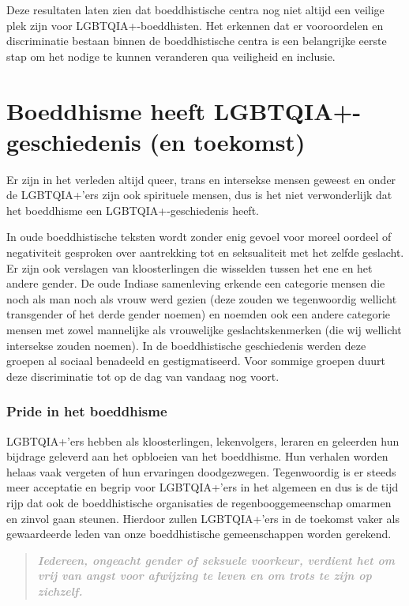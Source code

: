 \documentclass[12pt,openany]{book}
\begin{document}
Deze resultaten laten zien dat boeddhistische centra nog niet altijd een veilige plek zijn voor LGBTQIA+-boeddhisten. Het erkennen dat er vooroordelen en discriminatie bestaan binnen de boeddhistische centra is een belangrijke eerste stap om het nodige te kunnen veranderen qua veiligheid en inclusie.

\section*{Boeddhisme heeft LGBTQIA+-geschiedenis (en toekomst)}

Er zijn in het verleden altijd queer, trans en intersekse mensen geweest en onder de LGBTQIA+'ers zijn ook spirituele mensen, dus is het niet verwonderlijk dat het boeddhisme een LGBTQIA+-geschiedenis heeft.

In oude boeddhistische teksten wordt zonder enig gevoel voor moreel oordeel of negativiteit gesproken over aantrekking tot en seksualiteit met het zelfde geslacht. Er zijn ook verslagen van kloosterlingen die wisselden tussen het ene en het andere gender. De oude Indiase samenleving erkende een categorie mensen die noch als man noch als vrouw werd gezien (deze zouden we tegenwoordig wellicht transgender of het derde gender noemen) en noemden ook een andere categorie mensen met zowel mannelijke als vrouwelijke geslachtskenmerken (die wij wellicht intersekse zouden noemen). In de boeddhistische geschiedenis werden deze groepen al sociaal benadeeld en gestigmatiseerd. Voor sommige groepen duurt deze discriminatie tot op de dag van vandaag nog voort.

\subsubsection*{Pride in het boeddhisme}

LGBTQIA+'ers hebben als kloosterlingen, lekenvolgers, leraren en geleerden hun bijdrage geleverd aan het opbloeien van het boeddhisme. Hun verhalen worden helaas vaak vergeten of hun ervaringen doodgezwegen. Tegenwoordig is er steeds meer acceptatie en begrip voor LGBTQIA+'ers in het algemeen en dus is de tijd rijp dat ook de boeddhistische organisaties de regenbooggemeenschap omarmen en zinvol gaan steunen. Hierdoor zullen LGBTQIA+'ers in de toekomst vaker als gewaardeerde leden van onze boeddhistische gemeenschappen worden gerekend.

\begin{quote}
\textit{\large \textbf{\textcolor{darkgray}{Iedereen, ongeacht gender of seksuele voorkeur, verdient het om vrij van angst voor afwijzing te leven en om trots te zijn op zichzelf.}}}
\end{quote}
\end{document}
